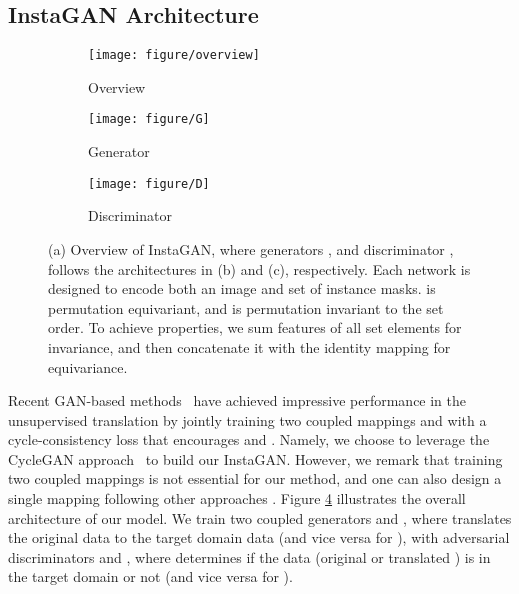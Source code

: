 \documentclass{article} \usepackage{iclr2019_conference,times}
\begin{document}
\vspace{-0.05in}
\subsection{InstaGAN Architecture}
\label{sec:method-architecture}
\vspace{-0.05in}

\begin{figure}[t]
\vspace{-0.2in}
\centering
\begin{subfigure}{.26\textwidth}
	\centering
	\texttt{[image: figure/overview]}
	\caption{Overview}\label{fig:architecturea}
\end{subfigure}
\begin{subfigure}{.38\textwidth}
	\centering
	\texttt{[image: figure/G]}
	\caption{Generator }\label{fig:architectureb}
\end{subfigure}
\begin{subfigure}{.34\textwidth}
	\centering
	\texttt{[image: figure/D]}
	\caption{Discriminator }\label{fig:architecturec}
\end{subfigure}
\caption{
(a) Overview of InstaGAN,
where generators ,  and discriminator ,  follows the architectures in (b) and (c), respectively.
Each network is designed to encode both an image and set of instance masks.
 is permutation equivariant, and  is permutation invariant to the set order.
To achieve properties,
we sum features of all set elements for invariance, 
and then concatenate it with the identity mapping for equivariance. 
} \label{fig:architecture}
\vspace{-0.1in}
\end{figure}

Recent GAN-based methods~\citep{zhu2017unpaired, liu2017unsupervised} have achieved impressive performance in the unsupervised translation by jointly training two coupled mappings  and  with a cycle-consistency loss that encourages  and .
Namely, we choose to leverage the CycleGAN approach~\citep{zhu2017unpaired} to build our InstaGAN.
However, we remark that training two coupled mappings is not essential for our method,
and one can also design a single mapping following other approaches \citep{benaim2017one, galanti2018role}.
Figure \ref{fig:architecture} illustrates the overall architecture of our model.
We train two coupled generators 
and ,
where  translates the original data  to
the target domain data  (and vice versa for ),
with adversarial discriminators 
and ,
where  determines if the data (original  or translated )
is in the target domain  or not (and vice versa for ).
\end{document}
